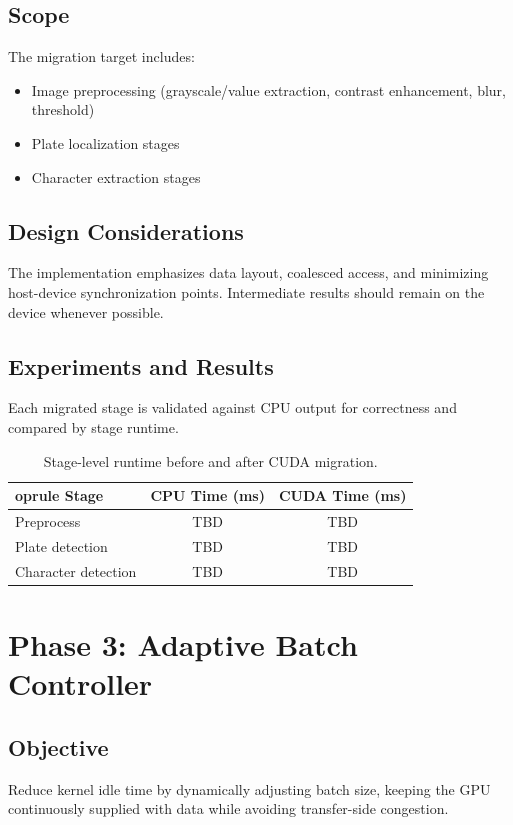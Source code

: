 \subsection{Scope}
The migration target includes:
\begin{itemize}
    \item Image preprocessing (grayscale/value extraction, contrast enhancement, blur, threshold)
    \item Plate localization stages
    \item Character extraction stages
\end{itemize}


\subsection{Design Considerations}
The implementation emphasizes data layout, coalesced access, and minimizing host-device synchronization points. Intermediate results should remain on the device whenever possible.

\subsection{Experiments and Results}
Each migrated stage is validated against CPU output for correctness and compared by stage runtime.

\begin{table}[H]
\centering
\begin{tabular}{lcc}
	oprule
Stage & CPU Time (ms) & CUDA Time (ms) \\
\midrule
Preprocess & TBD & TBD \\
Plate detection & TBD & TBD \\
Character detection & TBD & TBD \\
\bottomrule
\end{tabular}
\caption{Stage-level runtime before and after CUDA migration.}
\end{table}


\section{Phase 3: Adaptive Batch Controller}

\subsection{Objective}
Reduce kernel idle time by dynamically adjusting batch size, keeping the GPU continuously supplied with data while avoiding transfer-side congestion.

